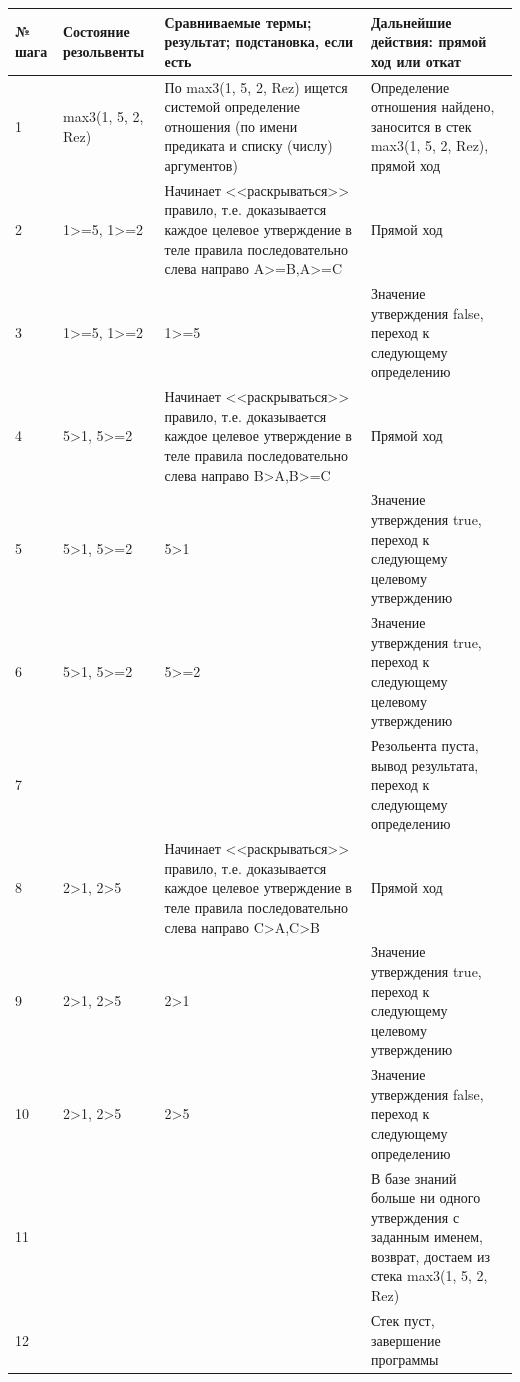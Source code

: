 \documentclass[a4paper,14pt]{extreport} %
\begin{document}
\begin{longtable}{|p{0.5cm}|p{4cm}|p{7cm}|p{5.5cm}|}
	\hline
 	№ шага & Состояние резольвенты & Сравниваемые термы; результат; подстановка, если есть  & Дальнейшие действия: прямой ход или откат \\ \hline
	1 & max3(1, 5, 2, Rez) & По max3(1, 5, 2, Rez) ищется системой определение отношения (по имени предиката и списку (числу) аргументов) & Определение отношения найдено, заносится в стек max3(1, 5, 2, Rez), прямой ход \\ \hline
	2 &1>=5, 1>=2& Начинает <<раскрываться>> правило, т.е. доказывается каждое целевое утверждение в теле правила последовательно слева направо
	A>=B,A>=C
	
	& Прямой ход\\ \hline
	
	3 &1>=5, 1>=2& 1>=5	
	& Значение утверждения false, переход к следующему определению\\ \hline

	4 &5>1, 5>=2& Начинает <<раскрываться>> правило, т.е. доказывается каждое целевое утверждение в теле правила последовательно слева направо
	B>A,B>=C
	
	& Прямой ход\\ \hline
	5 &5>1, 5>=2& 5>1 & Значение утверждения true, переход к следующему целевому утверждению\\ \hline
	6 &5>1, 5>=2& 5>=2 & Значение утверждения true, переход к следующему целевому утверждению\\ \hline
	7 && & Резольента пуста, вывод результата, переход к следующему определению\\ \hline
	
	8 &2>1, 2>5& Начинает <<раскрываться>> правило, т.е. доказывается каждое целевое утверждение в теле правила последовательно слева направо
	C>A,C>B
	
	& Прямой ход\\ \hline
	
	9 &2>1, 2>5& 2>1	
	& Значение утверждения true, переход к следующему целевому утверждению\\ \hline
	
	10 &2>1, 2>5& 2>5	
	& Значение утверждения false, переход к следующему определению\\ \hline
         11&&&В базе знаний больше ни одного утверждения с заданным именем, возврат, достаем из стека max3(1, 5, 2, Rez)  \\ \hline
	12 & &  & Стек пуст, завершение программы \\ \hline

\end{longtable}
\end{document}
